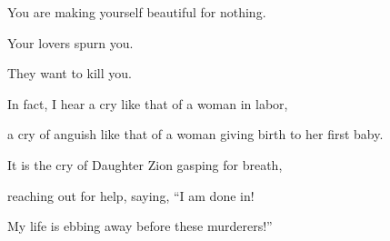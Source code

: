 {\par }{\Q You are making yourself beautiful
for nothing.
\par }{\Q Your lovers
spurn
you.
\par }{\Q They want
to kill you.
\par }{\Q {}In fact, I hear
a cry
like that
of a woman in labor,
\par }{\Q a cry
of anguish
like that of a woman giving birth
to her first
baby.
\par }{\Q It is the cry of Daughter
Zion
gasping
for
breath,
\par }{\Q reaching out for
help, saying, “I am done in!

\par }{\Q My life
is ebbing away before these murderers!”

\par }
